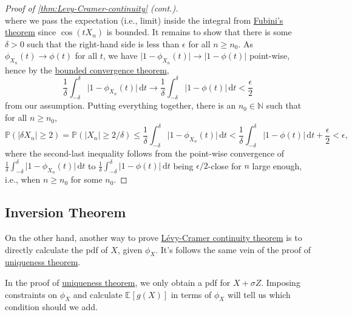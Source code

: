 \begin{proof}[Proof of \autoref{thm:Levy-Cramer-continuity} (cont.)]
\[	\]
	where we pass the expectation (i.e., limit) inside the integral from \href{https://en.wikipedia.org/wiki/Fubini's_theorem}{Fubini's theorem} since \(\cos (t X_n)\) is bounded. It remains to show that there is some \(\delta > 0\) such that the right-hand side is less than \(\epsilon \) for all \(n \geq n_0\). As \(\phi _{X_n}(t) \to \phi (t)\) for all \(t\), we have \(\vert 1 - \phi _{X_n}(t) \vert \to \vert 1 - \phi (t) \vert \) point-wise, hence by the \href{https://en.wikipedia.org/wiki/Dominated_convergence_theorem}{bounded convergence theorem},
	\[
		\frac{1}{\delta } \int_{-\delta }^{\delta } \vert 1 - \phi _{X_n}(t) \vert  \,\mathrm{d}t
		\to \frac{1}{\delta } \int_{-\delta }^{\delta } \vert 1 - \phi (t) \vert  \,\mathrm{d}t
		< \frac{\epsilon}{2}
	\]
	from our assumption. Putting everything together, there is an \(n_0 \in \mathbb{N} \) such that for all \(n \geq n_0\),
	\[
		\mathbb{P} (\vert \delta X_n \vert \geq 2)
		= \mathbb{P} (\vert X_n \vert \geq 2 / \delta )
		\leq \frac{1}{\delta } \int_{-\delta }^{\delta } \vert 1 - \phi _{X_n}(t) \vert  \,\mathrm{d}t
		< \frac{1}{\delta } \int_{-\delta }^{\delta } \vert 1 - \phi (t) \vert  \,\mathrm{d}t + \frac{\epsilon}{2}
		< \epsilon ,
	\]
	where the second-last inequality follows from the point-wise convergence of \(\frac{1}{\delta } \int_{-\delta }^{\delta } \vert 1 - \phi _{X_n}(t) \vert \,\mathrm{d}t\) to \(\frac{1}{\delta } \int_{-\delta }^{\delta } \vert 1 - \phi (t) \vert \,\mathrm{d}t\) being \(\epsilon / 2\)-close for \(n\) large enough, i.e., when \(n \geq n_0\) for some \(n_0\).
\end{proof}

\subsection{Inversion Theorem}
On the other hand, another way to prove \hyperref[thm:Levy-Cramer-continuity]{Lévy-Cramer continuity theorem} is to directly calculate the pdf of \(X\), given \(\phi _X\). It's follows the same vein of the proof of \hyperref[thm:characteristic-function-uniqueness]{uniqueness theorem}.

\begin{intuition}
	In the proof of \hyperref[thm:characteristic-function-uniqueness]{uniqueness theorem}, we only obtain a pdf for \(X + \sigma Z\). Imposing constraints on \(\phi _X\) and calculate \(\mathbb{E}_{}[g(X)] \) in terms of \(\phi _X\) will tell us which condition should we add.
\end{intuition}

